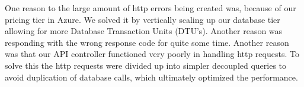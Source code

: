 \documentclass{article}
\begin{document}
One reason to the large amount of http errors being created was, because of our pricing tier in Azure. We solved it by vertically scaling up our database tier allowing for more Database Transaction Units (DTU's). Another reason was responding with the wrong response code for quite some time. Another reason was that our API controller functioned very poorly in handling http requests. To solve this the http requests were divided up into simpler decoupled queries to avoid duplication of database calls, which ultimately optimized the performance.





\end{document}
